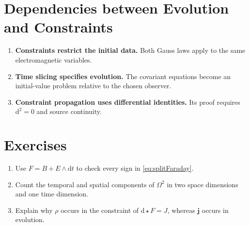 \documentclass[11pt,openany]{book}
\numberwithin{equation}{chapter}
\theoremstyle{definition}
\theoremstyle{remark}
\newcommand{\dd}{\mathrm d}
\begin{document}
\begin{center}
\end{center}

\section{Dependencies between Evolution and Constraints}
\begin{enumerate}
\item \textbf{Constraints restrict the initial data.} Both Gauss laws apply to the same electromagnetic variables.
\item \textbf{Time slicing specifies evolution.} The covariant equations become an initial-value problem relative to the chosen observer.
\item \textbf{Constraint propagation uses differential identities.} Its proof requires $\dd^2=0$ and source continuity.
\end{enumerate}

\section{Exercises}
\begin{enumerate}
\item Use $F=B+E\wedge\dd t$ to check every sign in \eqref{eq:splitFaraday}.
\item Count the temporal and spatial components of $\Omega^2$ in two space dimensions and one time dimension.
\item Explain why $\rho$ occurs in the constraint of $\dd\star F=J$, whereas $\bm j$ occurs in evolution.
\end{enumerate}
\end{document}
